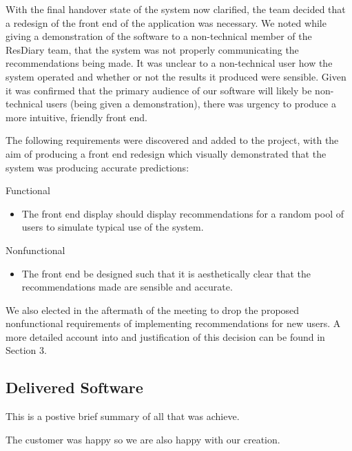 \documentclass{l3proj}
\begin{document}
With the final handover state of the system now clarified, the team decided that a redesign of the front end of the application was necessary. We noted while giving a demonstration of the software to a non-technical member of the ResDiary team, that the system was not properly communicating the recommendations being made. It was unclear to a non-technical user how the system operated and whether or not the results it produced were sensible. Given it was confirmed that the primary audience of our software will likely be non-technical users (being given a demonstration), there was urgency to produce a more intuitive, friendly front end. 

The following requirements were discovered and added to the project, with the aim of producing a front end redesign which visually demonstrated that the system was producing accurate predictions:

Functional
\begin{itemize}
\item The front end display should display recommendations for a random pool of users to simulate typical use of the system.
\end{itemize}

Nonfunctional
\begin{itemize}
\item The front end be designed such that it is aesthetically clear that the recommendations made are sensible and accurate.
\end{itemize}

We also elected in the aftermath of the meeting to drop the proposed nonfunctional requirements of implementing recommendations for new users. A more detailed account into and justification of this decision can be found in Section 3.

\subsection{Delivered Software}
\label{sec:finsoftware}


This is a postive brief summary of all that was achieve.

The customer was happy so we are also happy with our creation.
\end{document}
